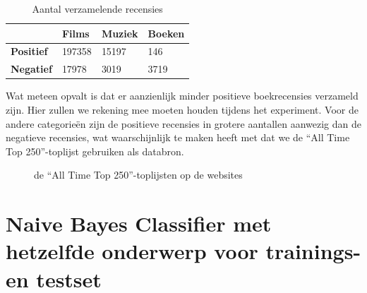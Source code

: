 \begin{table}[h]
\centering
\begin{tabular}{l|l|l|l|}
\cline{2-4}
                                        & \textbf{Films} & \textbf{Muziek} & \textbf{Boeken} \\ \hline
\multicolumn{1}{|l|}{\textbf{Positief}} & 197358         & 15197           & 146             \\ \hline
\multicolumn{1}{|l|}{\textbf{Negatief}} & 17978          & 3019            & 3719            \\ \hline
\end{tabular}
\caption{Aantal verzamelende recensies} 
\end{table}

Wat meteen opvalt is dat er aanzienlijk minder positieve boekrecensies verzameld zijn. Hier zullen we rekening mee moeten houden tijdens het experiment. Voor de andere categorie\"en zijn de positieve recensies in grotere aantallen aanwezig dan de negatieve recensies, wat waarschijnlijk te maken heeft met dat we de ``All Time Top 250''-toplijst gebruiken als databron.
\newpage
\begin{figure}%
    \centering
    \caption{de ``All Time Top 250''-toplijsten op de websites}%
\end{figure}

\section{Naive Bayes Classifier met hetzelfde onderwerp voor trainings- en testset}\label{Naive Bayes Classifier met hetzelfde onderwerp voor trainings- en testset}

